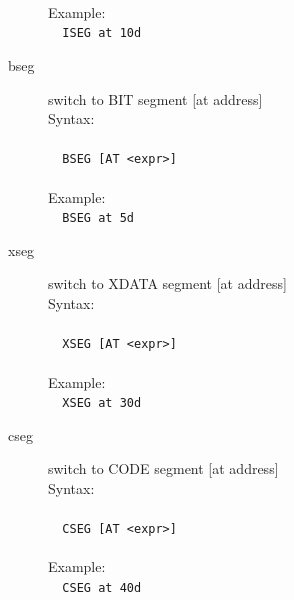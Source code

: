 \documentclass[a4paper,twoside,12pt]{book}
\begin{document}
\begin{description}
				\verb''\\
				Example:\\
				\verb'  '{\color{highlight_directive}\verb'ISEG'}\verb' '{\color{highlight_constant}\verb'at'}\verb' '{\color{highlight_dec}\verb'10d'}\\
			\item[bseg] switch to BIT segment [at address]\\
				Syntax:\\\\
				\verb'  '{\color{highlight_directive}\verb'BSEG'}\verb' '{\color{highlight_constant}\verb'[AT'}\verb' '{\color{highlight_symbol}\verb'<'}{\color{highlight_constant}\verb'expr'}{\color{highlight_symbol}\verb'>'}{\color{highlight_constant}\verb']'}\\
				\verb''\\
				Example:\\
				\verb'  '{\color{highlight_directive}\verb'BSEG'}\verb' '{\color{highlight_constant}\verb'at'}\verb' '{\color{highlight_dec}\verb'5d'}\\
			\item[xseg] switch to XDATA segment [at address]\\
				Syntax:\\\\
				\verb'  '{\color{highlight_directive}\verb'XSEG'}\verb' '{\color{highlight_constant}\verb'[AT'}\verb' '{\color{highlight_symbol}\verb'<'}{\color{highlight_constant}\verb'expr'}{\color{highlight_symbol}\verb'>'}{\color{highlight_constant}\verb']'}\\
				\verb''\\
				Example:\\
				\verb'  '{\color{highlight_directive}\verb'XSEG'}\verb' '{\color{highlight_constant}\verb'at'}\verb' '{\color{highlight_dec}\verb'30d'}\\
			\item[cseg] switch to CODE segment [at address]\\
				Syntax:\\\\
				\verb'  '{\color{highlight_directive}\verb'CSEG'}\verb' '{\color{highlight_constant}\verb'[AT'}\verb' '{\color{highlight_symbol}\verb'<'}{\color{highlight_constant}\verb'expr'}{\color{highlight_symbol}\verb'>'}{\color{highlight_constant}\verb']'}\\
				\verb''\\
				Example:\\
				\verb'  '{\color{highlight_directive}\verb'CSEG'}\verb' '{\color{highlight_constant}\verb'at'}\verb' '{\color{highlight_dec}\verb'40d'}\\

\end{description}
\end{document}
